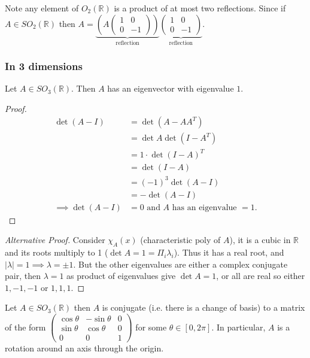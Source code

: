 Note any element of $O_2(\mathbb{R})$ is a product of at most two reflections.
Since if $A \in SO_2(\mathbb{R})$ then $A = \underbrace{\left( A \begin{pmatrix}1 & 0 \\0 & -1\end{pmatrix} \right)}_\text{reflection} \underbrace{\begin{pmatrix}1 & 0 \\0 & -1\end{pmatrix}}_\text{reflection}$.

\subsubsection{In 3 dimensions}
\begin{proposition}\label{prp:11}
    Let $A \in SO_3(\mathbb{R})$.
    Then $A$ has an eigenvector with eigenvalue $1$.
\end{proposition} 

\begin{proof}
    \begin{align*}
        \det (A - I) &= \det  (A - A A^T) \\
        &= \det A \det (I - A^T) \\
        &= 1 \cdot \det (I - A)^T \\
        &= \det (I - A) \\
        &= (-1)^3 \det (A - I) \\
        &= - \det (A - I) \\
        \implies \det (A - I) &= 0 \text{ and $A$ has an eigenvalue $= 1$}.
    \end{align*} 
\end{proof} 

\begin{proof}[Alternative Proof]
    Consider $\chi_A(x)$ (characteristic poly of $A$), it is a cubic in $\mathbb{R}$ and its roots multiply to 1 ($\det A = 1 = \Pi_i \lambda_i$).
    Thus it has a real root, and $|\lambda| = 1 \implies \lambda = \pm 1$. 
    But the other eigenvalues are either a complex conjugate pair, then $\lambda = 1$ as product of eigenvalues give $\det A = 1$, or all are real so either $1, -1, -1$ or $1, 1, 1$.
\end{proof} 

\begin{theorem} \label{thm:11}
    Let $A \in SO_3(\mathbb{R})$ then $A$ is conjugate (i.e. there is a change of basis) to a matrix of the form $\begin{pmatrix}
    \cos \theta & -\sin \theta & 0 \\
    \sin \theta & \cos \theta & 0 \\
    0 & 0 & 1
    \end{pmatrix}$ for some $\theta \in [0, 2 \pi]$.
    In particular, $A$ is a rotation around an axis through the origin.
\end{theorem} 

